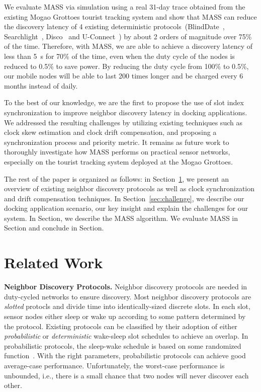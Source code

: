 \documentclass[twoside,twocolumn]{article}
\begin{document}
We evaluate MASS via simulation using a real 31-day trace obtained from the existing Mogao Grottoes tourist tracking system
and show that MASS can reduce the discovery latency of 4 existing deterministic protocols~(BlindDate~\citep{wang13blinddate}, 
Searchlight~\citep{bakht2012searchlight}, Disco~\citep{Dutta2008Practical} and U-Connect~\citep{kandhalu2010u}) by about 2 
orders of magnitude over 75\% of the time. Therefore, with MASS, we are able to achieve a discovery latency of less than 5~s
for 70\% of the time, even when the duty cycle of the nodes is reduced to 0.5\% to save power. By reducing the duty cycle
from 100\% to 0.5\%, our mobile nodes will be able to last 200 times longer and be charged every 6 months instead of daily.

To the best of our knowledge, we are the first to propose the use of slot index synchronization to improve neighbor discovery
latency in docking applications. We addressed the resulting challenges by utilizing existing techniques such as clock skew
estimation and clock drift compensation, and proposing a synchronization process and priority metric. It remains as future
work to thoroughly investigate how MASS performs on practical sensor networks, especially on the tourist tracking system
deployed at the Mogao Grottoes.

The rest of the paper is organized as follows: in Section~\ref{sec:related}, we present an overview of existing neighbor 
discovery protocols as well as clock synchronization and drift compensation techniques. In Section~\ref{sec:challenge}, 
we describe our docking application scenario, our key insight and explain the challenges for our system. In Section, we 
describe the MASS algorithm. We evaluate MASS in Section and conclude in Section.

\section{Related Work}
\label{sec:related}

{\bf Neighbor Discovery Protocols.} Neighbor discovery protocols are needed in duty-cycled 
networks to ensure discovery. Most neighbor discovery protocols are \emph{slotted} protocls
and divide time into identically-sized discrete slots. In each slot, sensor nodes either
sleep or wake up according to some pattern determined by the protocol. Existing protocols
can be classified by their adoption of either \emph{probabilistic} or \emph{deterministic}
wake-sleep slot schedules to achieve an overlap. In probabilistic protocols, the sleep-wake 
schedule is based on some randomized function~\citep{mcglynn2001birthday}. With the right
parameters, probabilistic protocols can achieve good average-case performance. Unfortunately, 
the worst-case performance is unbounded, i.e., there is a small chance that two nodes will 
never discover each other.
\end{document}
